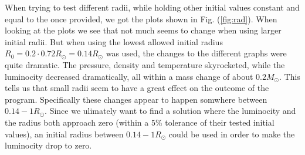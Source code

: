 \documentclass{emulateapj}
\begin{document}
	When trying to test different radii, while holding other initial values constant and equal to the once provided, we got the plots shown in Fig. (\ref{fig:rad}). When looking at the plots we see that not much seems to change when using larger initial radii. But when using the lowest allowed initial radius $R_0 = 0.2\cdot0.72 R_\odot = 0.14 R_\odot$ was used, the changes to the different graphs were quite dramatic. The pressure, density and temperature skyrocketed, while the luminocity decreased dramatically, all within a mass change of about $0.2M_\odot$. This tells us that small radii seem to have a great effect on the outcome of the program. Specifically these changes appear to happen somwhere between $0.14-1R_\odot$. Since we ulimately want to find a solution where the luminocity and the radius both approach zero (within a 5\% tolerance of their tested initial values), an initial radius between $0.14-1R_\odot$ could be used in order to make the luminocity drop to zero.
	
\end{document}
